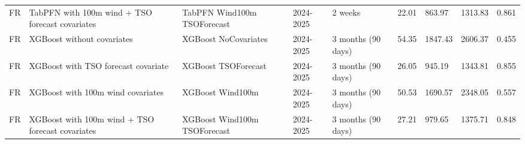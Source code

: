 \begin{longtable}{lllllllll}
FR & TabPFN with 100m wind + TSO forecast covariates & TabPFN Wind100m TSOForecast & 2024-2025 & 2 weeks & 22.01 & 863.97 & 1313.83 & 0.861 \\
FR & XGBoost without covariates & XGBoost NoCovariates & 2024-2025 & 3 months (90 days) & 54.35 & 1847.43 & 2606.37 & 0.455 \\
FR & XGBoost with TSO forecast covariate & XGBoost TSOForecast & 2024-2025 & 3 months (90 days) & 26.05 & 945.19 & 1343.81 & 0.855 \\
FR & XGBoost with 100m wind covariates & XGBoost Wind100m & 2024-2025 & 3 months (90 days) & 50.53 & 1690.57 & 2348.05 & 0.557 \\
FR & XGBoost with 100m wind + TSO forecast covariates & XGBoost Wind100m TSOForecast & 2024-2025 & 3 months (90 days) & 27.21 & 979.65 & 1375.71 & 0.848 \\
\end{longtable}
